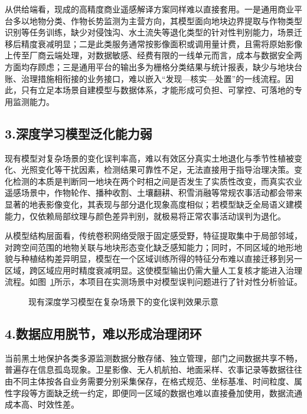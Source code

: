 从供给端看，现成的高精度商业遥感解译方案同样难以直接套用。一是通用商业平台多以地物分类、作物长势监测为主营方向，其模型面向地块边界提取与作物类型识别等任务训练，缺少对侵蚀沟、水土流失等退化类型的针对性判别能力，场景迁移后精度衰减明显；二是此类服务通常按影像面积或调用量计费，且需将原始影像上传至厂商云端处理，对数据敏感、经费有限的一线单元而言，成本与数据安全两方面均存顾虑；三是通用平台的输出多为栅格分类结果与统计报表，缺少与地块台账、治理措施相衔接的业务接口，难以嵌入“发现—核实—处置”的一线流程。因此，只有立足本场景自建模型与数据体系，才能形成可负担、可掌控、可落地的专用监测能力。

\subsection{3.深度学习模型泛化能力弱}

现有模型对复杂场景的变化误判率高，难以有效区分真实土地退化与季节性植被变化、光照变化等干扰因素，检测结果可靠性不足，无法直接用于指导治理决策。变化检测的本质是判断同一地块在两个时相之间是否发生了实质性改变，而真实农业遥感场景中，作物轮作、播种收割、土壤翻耕、积雪消融等常规农事活动都会带来显著的地表影像变化，其表现与部分退化现象高度相似；若模型缺乏全局语义建模能力，仅依赖局部纹理与颜色差异判别，就极易将正常农事活动误判为退化。

从模型结构层面看，传统卷积网络\cite{ref5,ref7}受限于固定感受野，特征提取集中于局部邻域，对跨空间范围的地物关联与地块形态变化缺乏感知能力；同时，不同区域的地形地貌与种植结构差异明显，模型在一个区域训练所得的特征分布难以直接迁移到另一区域，跨区域应用时精度衰减明显。这使模型输出仍需大量人工复核才能进入治理流程。如图~\ref{fig:img5}所示，本项目在实测场景中对模型误判问题进行了针对性分析验证。

\begin{figure}[htbp]
    \centering
    \caption{现有深度学习模型在复杂场景下的变化误判效果示意}
    \label{fig:img5}
\end{figure}

\subsection{4.数据应用脱节，难以形成治理闭环}

当前黑土地保护各类多源监测数据分散存储、独立管理，部门之间数据共享不畅，普遍存在信息孤岛现象。卫星影像、无人机航拍、地面采样、农事记录等数据往往由不同主体按各自业务需要分别采集保存，在格式规范、坐标基准、时间粒度、属性字段等方面缺乏统一约定，即便同一区域的数据也难以直接叠加使用，数据流通成本高、时效性差。

